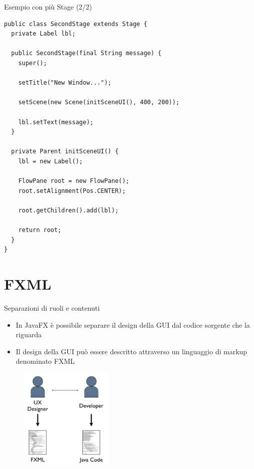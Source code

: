 \documentclass[presentation]{beamer}
\begin{document}
\begin{frame}[fragile]{Esempio con più Stage (2/2)}
\begin{lstlisting}[basicstyle=\tiny]
public class SecondStage extends Stage {
  private Label lbl;
	
  public SecondStage(final String message) {
    super();
		
	setTitle("New Window...");
    	
	setScene(new Scene(initSceneUI(), 400, 200));
		
	lbl.setText(message);
  }
	
  private Parent initSceneUI() {
    lbl = new Label();
		
	FlowPane root = new FlowPane();
	root.setAlignment(Pos.CENTER);
		
	root.getChildren().add(lbl);
		
	return root;
  }
}
\end{lstlisting}
\end{frame}



\section{FXML}

\begin{frame}{Separazioni di ruoli e contenuti}
\begin{itemize}\itemsep10pt
\item In JavaFX è possibile separare il design della GUI dal codice sorgente che la riguarda
\item Il design della GUI può essere descritto attraverso un linguaggio di markup denominato FXML
\end{itemize}
\begin{figure}
\includegraphics[width=0.4\textwidth]{img/soc.png}
\end{figure}
\end{frame}
\end{document}
